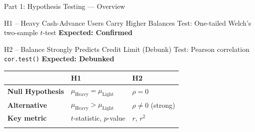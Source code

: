 \documentclass[
  ignorenonframetext,
  aspectratio=169]{beamer}
\begin{document}
\begin{frame}{Part 1: Hypothesis Testing --- Overview}
\protect{}\label{part-1-hypothesis-testing-overview}
\begin{block}{H1 -- Heavy Cash-Advance Users Carry Higher Balances}
Test: One-tailed Welch's two-sample $t$-test \hfill \textbf{Expected: Confirmed}
\end{block}

\begin{alertblock}{H2 -- Balance Strongly Predicts Credit Limit (Debunk)}
Test: Pearson correlation \texttt{cor.test()} \hfill \textbf{Expected: Debunked}
\end{alertblock}

\vspace{0.5em}

\begin{longtable}[]{@{}
  >{\raggedright\arraybackslash}p{}
  >{\raggedright\arraybackslash}p{}
  >{\raggedright\arraybackslash}p{}@{}}
\toprule\noalign{}
\begin{minipage}[b]{\linewidth}\raggedright
\end{minipage} & \begin{minipage}[b]{\linewidth}\raggedright
H1
\end{minipage} & \begin{minipage}[b]{\linewidth}\raggedright
H2
\end{minipage} \\
\midrule\noalign{}
\endhead
\textbf{Null Hypothesis} & \(\mu_{\text{Heavy}} = \mu_{\text{Light}}\) &
\(\rho = 0\) \\
\textbf{Alternative} & \(\mu_{\text{Heavy}} > \mu_{\text{Light}}\) &
\(\rho \neq 0\) (strong) \\
\textbf{Key metric} & \(t\)-statistic, \(p\)-value & \(r\), \(r^2\) \\
\bottomrule\noalign{}
\end{longtable}
\end{frame}
\end{document}
